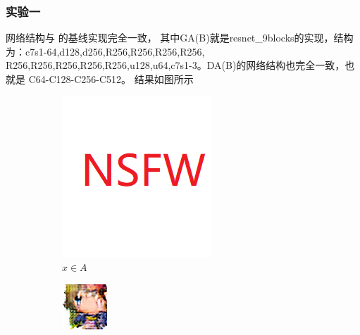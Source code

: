 \documentclass{beamer}
\begin{document}
\begin{frame}
\frametitle{实验一}
网络结构与 \cite{zhu2017unpaired}的基线实现完全一致，
其中GA(B)就是resnet\_9blocks的实现，结构为：c7s1-64,d128,d256,R256,R256,R256,R256,
R256,R256,R256,R256,R256,u128,u64,c7s1-3。DA(B)的网络结构也完全一致，也就是 C64-C128-C256-C512。
结果如图所示

\begin{figure}[htb]
    \centering
    \begin{subfigure}[b]{0.24\linewidth}
        \includegraphics[width=\linewidth]{NSFW.png}
        \caption{$x \in A$}
      \end{subfigure}
      \begin{subfigure}[b]{0.24\linewidth}
        \includegraphics[width=\linewidth]{exp1_fake_B.png}

\end{subfigure}
\end{figure}
\end{frame}
\end{document}
